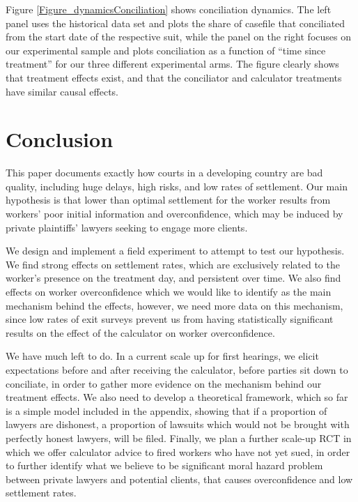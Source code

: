 \documentclass[11pt]{article}
\begin{document}
Figure \ref{Figure_dynamicsConciliation} shows conciliation dynamics. The left panel uses the historical data set  and plots the share of casefile that conciliated from the start date of the respective suit, while the panel on the right focuses on our experimental sample and plots conciliation as a function of ``time since treatment'' for our three different experimental arms. The figure clearly shows that treatment effects exist, and that the conciliator and calculator treatments have similar causal effects.


\section{Conclusion}

This paper documents exactly how courts in a developing country are bad quality, including huge delays, high risks, and low rates of settlement. Our main hypothesis is that lower than optimal settlement for the worker results from workers' poor initial information and overconfidence, which may be induced by private plaintiffs' lawyers seeking to engage more clients. 

We design and implement a field experiment to attempt to test our hypothesis. We find strong effects on settlement rates, which are exclusively related to the worker's presence on the treatment day, and persistent over time. We also find effects on worker overconfidence which we would like to identify as the main mechanism behind the effects, however, we need more data on this mechanism, since low rates of exit surveys prevent us from having statistically significant results on the effect of the calculator on worker overconfidence.

We have much left to do. In a current scale up for first hearings, we elicit expectations before and after receiving the calculator, before parties sit down to conciliate, in order to gather more evidence on the mechanism behind our treatment effects. We also need to develop a theoretical framework, which so far is a simple model included in the appendix, showing that if a proportion of lawyers are dishonest, a proportion of lawsuits which would not be brought with perfectly honest lawyers, will be filed. Finally, we plan a further scale-up RCT in which we offer calculator advice to fired workers who have not yet sued, in order to further identify what we believe to be significant moral hazard problem between private lawyers and potential clients, that causes overconfidence and low settlement rates.
\end{document}
